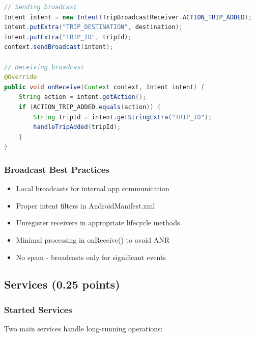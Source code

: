 \documentclass[12pt,a4paper]{article}
\begin{document}
\begin{lstlisting}[language=Java, caption=Custom Broadcast]
// Sending broadcast
Intent intent = new Intent(TripBroadcastReceiver.ACTION_TRIP_ADDED);
intent.putExtra("TRIP_DESTINATION", destination);
intent.putExtra("TRIP_ID", tripId);
context.sendBroadcast(intent);

// Receiving broadcast
@Override
public void onReceive(Context context, Intent intent) {
    String action = intent.getAction();
    if (ACTION_TRIP_ADDED.equals(action)) {
        String tripId = intent.getStringExtra("TRIP_ID");
        handleTripAdded(tripId);
    }
}
\end{lstlisting}

\subsubsection{Broadcast Best Practices}
\begin{itemize}
    \item Local broadcasts for internal app communication
    \item Proper intent filters in AndroidManifest.xml
    \item Unregister receivers in appropriate lifecycle methods
    \item Minimal processing in onReceive() to avoid ANR
    \item No spam - broadcasts only for significant events
\end{itemize}

\subsection{Services (0.25 points)}

\subsubsection{Started Services}
Two main services handle long-running operations:
\end{document}
